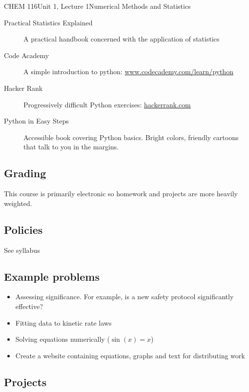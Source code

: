 \documentclass{article}
\begin{document}
\begin{tdoc}{CHEM 116}{Unit 1, Lecture 1}{Numerical Methods and Statistics}
\begin{description}
\item[Practical Statistics Explained]{A practical handbook concerned with the application of statistics}

\item[Code Academy]{A simple introduction to python: \href{https://www.codecademy.com/learn/python}{www.codecademy.com/learn/python}}

\item[Hacker Rank]{Progressively difficult Python exercises: \href{https://www.hackerrank.com}{hackerrank.com}}

\item[Python in Easy Steps]{Accessible book covering Python basics. Bright colors, friendly cartoons that talk to you in the margins.}

\end{description}

\subsection{Grading}

This course is primarily electronic so homework and projects are more
heavily weighted.

\subsection{Policies}
See syllabus

\subsection{Example problems}

\begin{itemize}

\item Assessing significance. For example, is a new safety protocol significantly effective?
\item Fitting data to kinetic rate laws
\item Solving equations numerically ($\sin(x) = x$)
\item Create a website containing equations, graphs and text for distributing work

\end{itemize}

\subsection{Projects}


\end{tdoc}
\end{document}
